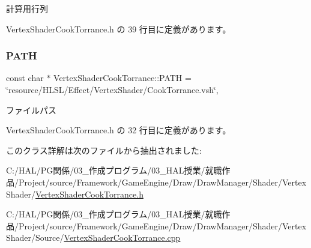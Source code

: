 計算用行列 



 Vertex\+Shader\+Cook\+Torrance.\+h の 39 行目に定義があります。

\mbox{\label{class_vertex_shader_cook_torrance_a8db3a6b351891fc9903c885df5c9111a}} 
\subsubsection{\texorpdfstring{P\+A\+TH}{PATH}}
{\footnotesize\ttfamily const char $\ast$ Vertex\+Shader\+Cook\+Torrance\+::\+P\+A\+TH = \char`\"{}resource/H\+L\+SL/Effect/Vertex\+Shader/Cook\+Torrance.\+vsh\char`\"{}\hspace{0.3cm}{\ttfamily [static]}, {\ttfamily [private]}}



ファイルパス 



 Vertex\+Shader\+Cook\+Torrance.\+h の 32 行目に定義があります。



このクラス詳解は次のファイルから抽出されました\+:\begin{DoxyCompactItemize}
\item 
C\+:/\+H\+A\+L/\+P\+G関係/03\+\_\+作成プログラム/03\+\_\+\+H\+A\+L授業/就職作品/\+Project/source/\+Framework/\+Game\+Engine/\+Draw/\+Draw\+Manager/\+Shader/\+Vertex\+Shader/\mbox{\hyperlink{_vertex_shader_cook_torrance_8h}{Vertex\+Shader\+Cook\+Torrance.\+h}}\item 
C\+:/\+H\+A\+L/\+P\+G関係/03\+\_\+作成プログラム/03\+\_\+\+H\+A\+L授業/就職作品/\+Project/source/\+Framework/\+Game\+Engine/\+Draw/\+Draw\+Manager/\+Shader/\+Vertex\+Shader/\+Source/\mbox{\hyperlink{_vertex_shader_cook_torrance_8cpp}{Vertex\+Shader\+Cook\+Torrance.\+cpp}}\end{DoxyCompactItemize}
